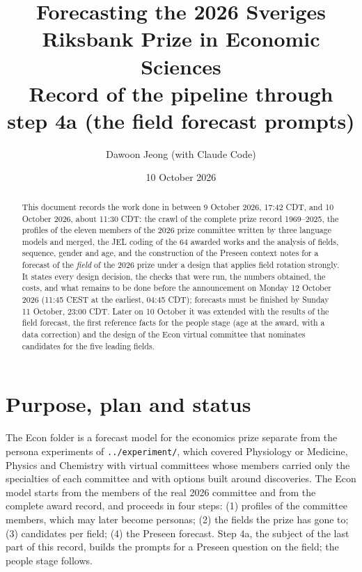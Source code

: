 \documentclass[11pt,a4paper]{article}
\title{Forecasting the 2026 Sveriges Riksbank Prize in Economic Sciences\\
\large Record of the \code{Nobel Prize/Econ} pipeline through step 4a (the field forecast prompts)}
\author{Dawoon Jeong (with Claude Code)}
\date{10 October 2026}
\newcommand{\code}[1]{\texttt{#1}}
\begin{document}
\maketitle

\begin{abstract}
\noindent This document records the work done in  between 9 October
2026, 17:42 CDT, and 10 October 2026, about 11:30 CDT: the crawl of the complete prize record 1969--2025, the profiles
of the eleven members of the 2026 prize committee written by three language models and merged, the JEL coding of the
64 awarded works and the analysis of fields, sequence, gender and age, and the construction of the Preseen context
notes for a forecast of the \emph{field} of the 2026 prize under a design that applies field rotation strongly. It
states every design decision, the checks that were run, the numbers obtained, the costs, and what remains to be done
before the announcement on Monday 12 October 2026 (11:45 CEST at the earliest, 04:45 CDT); forecasts must be finished
by Sunday 11 October, 23:00 CDT. Later on 10 October it was extended with the results of the field forecast, the first
reference facts for the people stage (age at the award, with a data correction) and the design of the Econ virtual
committee that nominates candidates for the five leading fields.
\end{abstract}

\tableofcontents

\section{Purpose, plan and status}

The Econ folder is a forecast model for the economics prize separate from the persona experiments of
\code{../experiment/}, which covered Physiology or Medicine, Physics and Chemistry with virtual committees whose
members carried only the specialties of each committee and with options built around discoveries. The Econ model
starts from the members of the real 2026 committee and from the complete award record, and proceeds in four steps:
(1) profiles of the committee members, which may later become personas; (2) the fields the prize has gone to;
(3) candidates per field; (4) the Preseen forecast. Step 4a, the subject of the last part of this record, builds the
prompts for a Preseen question on the field; the people stage follows.
\end{document}
